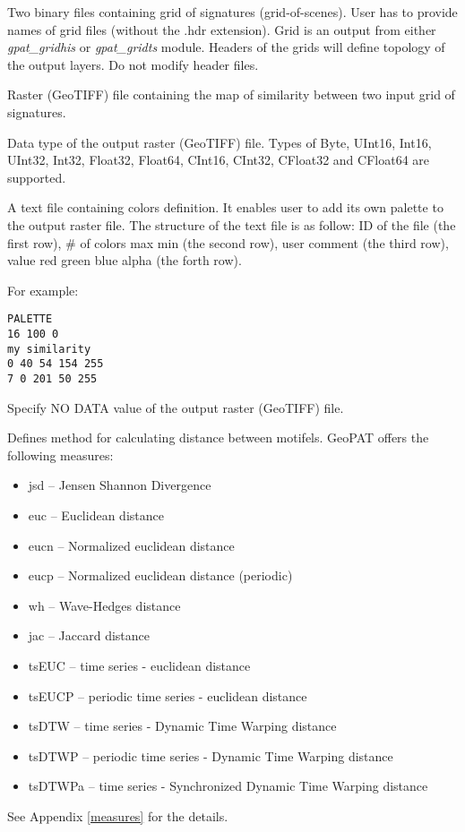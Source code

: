 
Two binary files containing grid of signatures (grid-of-scenes). 
User has to provide names of grid files (without the .hdr extension). 
Grid is an output from either {\it gpat\_gridhis} or {\it gpat\_gridts} module. 
Headers of the grids will define topology of the output layers. 
Do not modify header files.


Raster (GeoTIFF) file containing the map of similarity between two input grid of signatures. 


Data type of the output raster (GeoTIFF) file. Types of Byte, UInt16, Int16, UInt32, Int32, Float32, Float64, CInt16, CInt32, CFloat32 and CFloat64 are supported.


A text file containing colors definition. 
It enables user to add its own palette to the output raster file.
The structure of the text file is as follow:
ID of the file (the first row), \# of colors max min (the second row), user comment (the third row), value red green blue alpha (the forth row). 

For example: \\
\begin{minipage}{\linewidth}
\begin{lstlisting}
PALETTE
16 100 0
my similarity
0 40 54 154 255
7 0 201 50 255
\end{lstlisting}
\end{minipage}


Specify NO DATA value of the output raster (GeoTIFF) file.


Defines method for calculating distance between motifels. 
GeoPAT offers the following measures: 
\begin{itemize}
	\item jsd -- Jensen Shannon Divergence
	\item euc -- Euclidean distance
	\item eucn -- Normalized euclidean distance
	\item eucp -- Normalized euclidean distance (periodic)
	\item wh -- Wave-Hedges distance
	\item jac -- Jaccard distance
	\item tsEUC -- time series - euclidean distance
	\item tsEUCP -- periodic time series - euclidean distance
	\item tsDTW -- time series - Dynamic Time Warping distance
	\item tsDTWP -- periodic time series - Dynamic Time Warping distance
	\item tsDTWPa -- time series - Synchronized Dynamic Time Warping distance
\end{itemize}
See Appendix \ref{measures} for the details.

